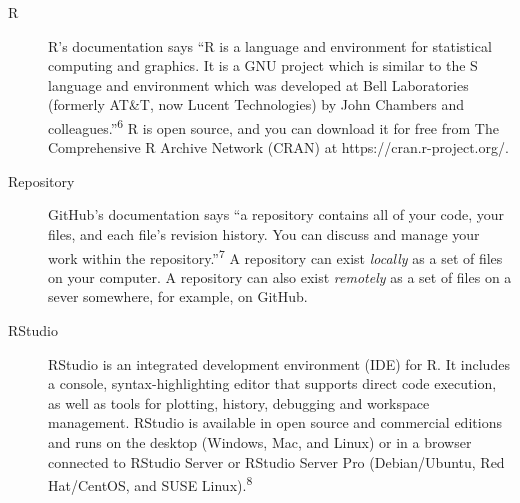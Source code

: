 \documentclass[
  letterpaper,
  DIV=11,
  numbers=noendperiod]{scrreprt}
\begin{document}
\begin{description}
\item[\label{glossary-r}{R}]
R's documentation says ``R is a language and environment for statistical
computing and graphics. It is a GNU project which is similar to the S
language and environment which was developed at Bell Laboratories
(formerly AT\&T, now Lucent Technologies) by John Chambers and
colleagues.''\textsuperscript{6} R is open source, and you can download
it for free from The Comprehensive R Archive Network (CRAN) at
https://cran.r-project.org/.
\item[\label{glossary-repository}{Repository}]
GitHub's documentation says ``a repository contains all of your code,
your files, and each file's revision history. You can discuss and manage
your work within the repository.''\textsuperscript{7} A repository can
exist \emph{locally} as a set of files on your computer. A repository
can also exist \emph{remotely} as a set of files on a sever somewhere,
for example, on GitHub.
\item[\label{glossary-rstudio}{RStudio}]
RStudio is an integrated development environment (IDE) for R. It
includes a console, syntax-highlighting editor that supports direct code
execution, as well as tools for plotting, history, debugging and
workspace management. RStudio is available in open source and commercial
editions and runs on the desktop (Windows, Mac, and Linux) or in a
browser connected to RStudio Server or RStudio Server Pro
(Debian/Ubuntu, Red Hat/CentOS, and SUSE Linux).\textsuperscript{8}
\end{description}
\end{document}
